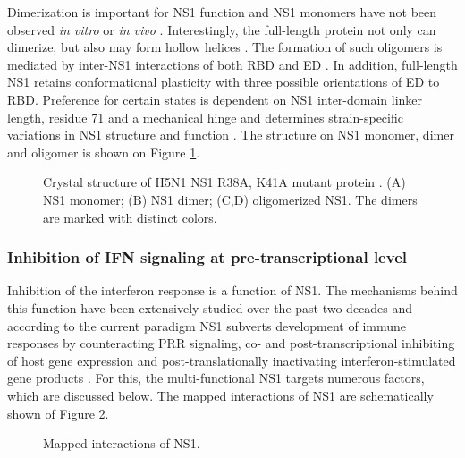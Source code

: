 		Dimerization is important for \gls{NS1} function and \gls{NS1} monomers have not been observed \textit{in vitro} or \textit{in vivo} \parencite{Hale2014}. Interestingly, the full-length protein not only can dimerize, but also may form hollow helices \parencite{Bornholdt2008}. The formation of such oligomers is mediated by inter-NS1 interactions of both \gls{RBD} and \gls{ED} \parencite{Bornholdt2008, Carrillo2014}. In addition, full-length \gls{NS1} retains conformational plasticity with three possible orientations of \gls{ED} to \gls{RBD}. Preference for certain states is dependent on \gls{NS1} inter-domain linker length, residue 71 and a mechanical hinge and determines strain-specific variations in \gls{NS1} structure and function \parencite{Carrillo2014}. The structure on NS1 monomer, dimer and oligomer is shown on Figure \ref{fig:structure}.
		
		\begin{figure}[h]
			\centering
			\caption{Crystal structure of H5N1 NS1 R38A, K41A mutant protein \parencite{Bornholdt2008}. (A) NS1 monomer; (B) NS1 dimer; (C,D) oligomerized NS1. The dimers are marked with distinct colors.} \label{fig:structure}
		\end{figure}
		
	
		\subsubsection{Inhibition of IFN signaling at pre-transcriptional level} \label{sec:pre-transcriptional}
		
		Inhibition of the interferon response is a function of NS1. The mechanisms behind this function have been extensively studied over the past two decades and according to the current paradigm NS1 subverts development of immune responses by counteracting PRR signaling, co- and post-transcriptional inhibiting of host gene expression and post-translationally inactivating  interferon-stimulated gene products \parencite{Ayllon2014}.	For this, the multi-functional NS1 targets numerous factors, which are discussed below. The mapped interactions of NS1 are schematically shown of Figure \ref{fig:NS1}.
		
		\begin{figure}[h]
			\centering
			\caption{Mapped interactions of NS1.} \label{fig:NS1}
		\end{figure}
				
